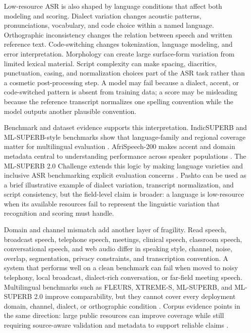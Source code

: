 \documentclass[pdflatex,sn-basic,iicol]{sn-jnl}
\theoremstyle{thmstyleone}
\theoremstyle{thmstyletwo}
\theoremstyle{thmstylethree}
\begin{document}
Low-resource ASR is also shaped by language conditions that affect both modeling and scoring. Dialect variation changes acoustic patterns, pronunciations, vocabulary, and code choice within a named language. Orthographic inconsistency changes the relation between speech and written reference text. Code-switching changes tokenization, language modeling, and error interpretation. Morphology can create large surface-form variation from limited lexical material. Script complexity can make spacing, diacritics, punctuation, casing, and normalization choices part of the ASR task rather than a cosmetic post-processing step. A model may fail because a dialect, accent, or code-switched pattern is absent from training data; a score may be misleading because the reference transcript normalizes one spelling convention while the model outputs another plausible convention.

Benchmark and dataset evidence supports this interpretation. IndicSUPERB and ML-SUPERB-style benchmarks show that language-family and regional coverage matter for multilingual evaluation \citep{javed2023indsuperb,shi2023mlsuperb}. AfriSpeech-200 makes accent and domain metadata central to understanding performance across speaker populations \citep{olatunji2023_afrispeech200}. The ML-SUPERB 2.0 Challenge extends this logic by making language varieties and inclusive ASR benchmarking explicit evaluation concerns \citep{chen2025mlsuperb2challenge}. Pashto can be used as a brief illustrative example of dialect variation, transcript normalization, and script consistency, but the field-level claim is broader: a language is low-resource when its available resources fail to represent the linguistic variation that recognition and scoring must handle.

Domain and channel mismatch add another layer of fragility. Read speech, broadcast speech, telephone speech, meetings, clinical speech, classroom speech, conversational speech, and web audio differ in speaking style, channel, noise, overlap, segmentation, privacy constraints, and transcription convention. A system that performs well on a clean benchmark can fail when moved to noisy telephony, local broadcast, dialect-rich conversation, or far-field meeting speech. Multilingual benchmarks such as FLEURS, XTREME-S, ML-SUPERB, and ML-SUPERB 2.0 improve comparability, but they cannot cover every deployment domain, channel, dialect, or orthographic condition \citep{conneau2022fleurs,conneau2022xtreme_s,shi2024mlsuperb2}. Corpus evidence points in the same direction: large public resources can improve coverage while still requiring source-aware validation and metadata to support reliable claims \citep{ardila2020commonvoice,wang2021voxpopuli,lau2025_data_quality_multilingual_speech}.
\end{document}

